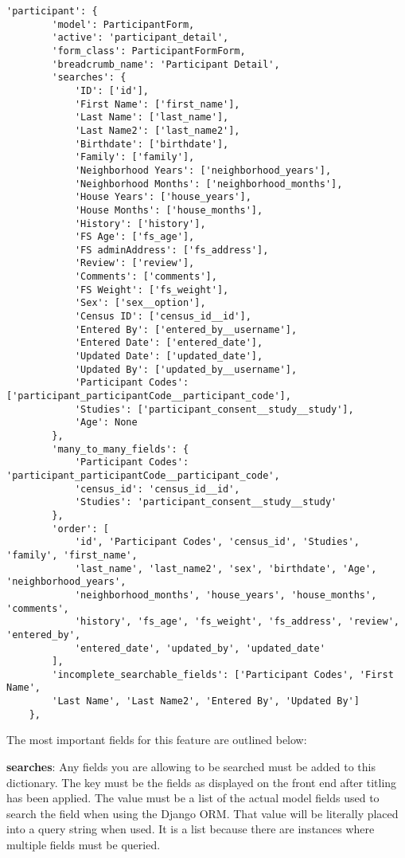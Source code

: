 \documentclass{article}
\begin{document}
\begin{verbatim}
'participant': {
        'model': ParticipantForm,
        'active': 'participant_detail',
        'form_class': ParticipantFormForm,
        'breadcrumb_name': 'Participant Detail',
        'searches': {
            'ID': ['id'],
            'First Name': ['first_name'],
            'Last Name': ['last_name'],
            'Last Name2': ['last_name2'],
            'Birthdate': ['birthdate'],
            'Family': ['family'],
            'Neighborhood Years': ['neighborhood_years'],
            'Neighborhood Months': ['neighborhood_months'],
            'House Years': ['house_years'],
            'House Months': ['house_months'],
            'History': ['history'],
            'FS Age': ['fs_age'],
            'FS adminAddress': ['fs_address'],
            'Review': ['review'],
            'Comments': ['comments'],
            'FS Weight': ['fs_weight'],
            'Sex': ['sex__option'],
            'Census ID': ['census_id__id'],
            'Entered By': ['entered_by__username'],
            'Entered Date': ['entered_date'],
            'Updated Date': ['updated_date'],
            'Updated By': ['updated_by__username'],
            'Participant Codes': ['participant_participantCode__participant_code'],
            'Studies': ['participant_consent__study__study'],
            'Age': None
        },
        'many_to_many_fields': {
            'Participant Codes': 'participant_participantCode__participant_code',
            'census_id': 'census_id__id',
            'Studies': 'participant_consent__study__study'
        },
        'order': [
            'id', 'Participant Codes', 'census_id', 'Studies', 'family', 'first_name', 
            'last_name', 'last_name2', 'sex', 'birthdate', 'Age', 'neighborhood_years', 
            'neighborhood_months', 'house_years', 'house_months', 'comments', 
            'history', 'fs_age', 'fs_weight', 'fs_address', 'review', 'entered_by', 
            'entered_date', 'updated_by', 'updated_date'
        ],
        'incomplete_searchable_fields': ['Participant Codes', 'First Name', 
        'Last Name', 'Last Name2', 'Entered By', 'Updated By']
    },
\end{verbatim}
The most important fields for this feature are outlined below:

\textbf{searches}: Any fields you are allowing to be searched must be added to this dictionary. The key must be the fields as displayed on the front end after titling has been applied. The value must be a list of the actual model fields used to search the field when using the Django ORM. That value will be literally placed into a query string when used. It is a list because there are instances where multiple fields must be queried.
\end{document}
